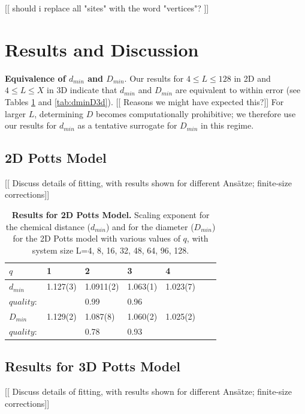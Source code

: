 \documentclass[aps, preprint, groupedaddress]{revtex4}
\begin{document}
[[ should i replace all "sites" with the word "vertices"? ]]

\section{Results and Discussion}

{\bf Equivalence of $d_{min}$ and $D_{min}$}.  Our results for $4 \le L \le 128$ in 2D and   $4 \le L \le X$ in 3D indicate that $d_{min}$ and $D_{min}$ are equivalent to within error (see Tables \ref{tab:dminD2d} and \ref{tab:dminD3d}).  [[ Reasons we might have expected this?]] For larger $L$, determining $D$ becomes computationally prohibitive; we therefore use our results for $d_{min}$ as a tentative surrogate for $D_{min}$ in this regime.  

\subsection{2D Potts Model}

[[ Discuss details of fitting, with results shown for  different Ans\"{a}tze; finite-size corrections]]

\begin{table}[h]
\begin{center}
\begin{tabular}{| l | l | l | l | l | l | l |}
\hline
$q$ & 1 & 2 & 3 & 4 \\
\hline
$d_{min}$ & 1.127(3) & 1.0911(2) & 1.063(1) & 1.023(7) \\
$quality:$ &  & 0.99 & 0.96 & \\
\hline
$D_{min}$ & 1.129(2) & 1.087(8) & 1.060(2) & 1.025(2) \\
$quality:$ &  & 0.78 & 0.93 & \\
\hline
\end{tabular}
\caption{\label{tab:dminD2d} {\bf Results for 2D Potts Model.} Scaling exponent for the chemical distance ($d_{min}$) and for the diameter ($D_{min}$) for the 2D Potts model with various values of $q$, with system size L=4, 8, 16, 32, 48, 64, 96, 128.}
\end{center}
\end{table}

\subsection{Results for 3D Potts Model}

[[ Discuss details of fitting, with results shown for  different Ans\"{a}tze; finite-size corrections]]
\end{document}
